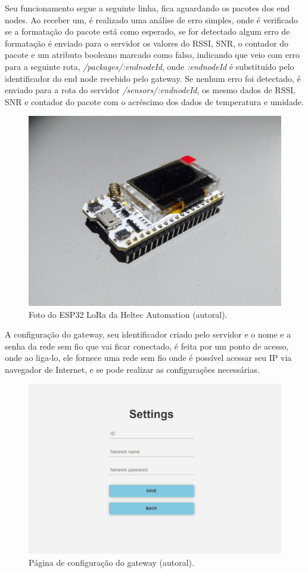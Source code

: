 Seu funcionamento segue a seguinte linha, fica aguardando os pacotes dos end nodes. Ao receber um, é realizado uma análise de erro simples, onde é verificado se a formatação do pacote está como esperado, se for detectado algum erro de formatação é enviado para o servidor os valores do RSSI, SNR, o contador do pacote e um atributo booleano marcado como falso, indicando que veio com erro para a seguinte rota, \textit{/packages/:endnodeId}, onde \textit{:endnodeId} é substituído pelo identificador do end node recebido pelo gateway. Se nenhum erro foi detectado, é enviado para a rota do servidor \textit{/sensors/:endnodeId}, os mesmo dados de RSSI, SNR e contador do pacote com o acréscimo dos dados de temperatura e umidade.

\begin{figure}[H]
  \centering
  \includegraphics[width=.80\textwidth]{assets/esp32-lora.png} 
  \caption{Foto do ESP32 LoRa da Heltec Automation (autoral).}
  \label{fig:esp32-lora} 
\end{figure}

A configuração do gateway, seu identificador criado pelo servidor e o nome e a senha da rede sem fio que vai ficar conectado, é feita por um ponto de acesso, onde ao liga-lo, ele fornece uma rede sem fio onde é possível acessar seu IP via navegador de Internet, e se pode realizar as configurações necessárias.

\begin{figure}[H]
  \centering
  \includegraphics[width=.80\textwidth]{assets/gateway-ap.png} 
  \caption{Página de configuração do gateway (autoral).}
  \label{fig:gateway-ap} 
\end{figure}

